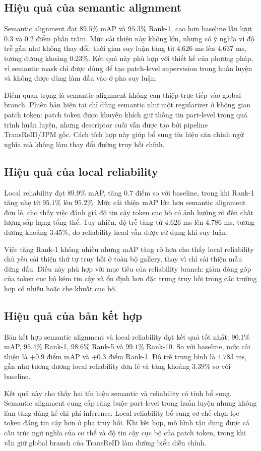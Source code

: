 \subsection{Hiệu quả của semantic alignment}

Semantic alignment đạt $89.5\%$ mAP và $95.3\%$ Rank-1, cao hơn baseline lần
lượt $0.3$ và $0.2$ điểm phần trăm. Mức cải thiện này không lớn, nhưng có ý
nghĩa vì độ trễ gần như không thay đổi: thời gian suy luận tăng từ $4.626$ ms
lên $4.637$ ms, tương đương khoảng $0.23\%$. Kết quả này phù hợp với thiết kế
của phương pháp, vì semantic mask chỉ được dùng để tạo patch-level supervision
trong huấn luyện và không được dùng làm đầu vào ở pha suy luận.

Điểm quan trọng là semantic alignment không can thiệp trực tiếp vào global
branch. Phiên bản hiện tại chỉ dùng semantic như một regularizer ở không gian
patch token: patch token được khuyến khích giữ thông tin part-level trong quá
trình huấn luyện, nhưng descriptor cuối vẫn được tạo bởi pipeline TransReID/JPM
gốc. Cách tích hợp này giúp bổ sung tín hiệu căn chỉnh ngữ nghĩa mà không làm
thay đổi đường truy hồi chính.

\subsection{Hiệu quả của local reliability}

Local reliability đạt $89.9\%$ mAP, tăng $0.7$ điểm so với baseline, trong khi
Rank-1 tăng nhẹ từ $95.1\%$ lên $95.2\%$. Mức cải thiện mAP lớn hơn semantic
alignment đơn lẻ, cho thấy việc đánh giá độ tin cậy token cục bộ có ảnh hưởng
rõ đến chất lượng sắp hạng tổng thể. Tuy nhiên, độ trễ tăng từ $4.626$ ms lên
$4.786$ ms, tương đương khoảng $3.45\%$, do reliability head vẫn được sử dụng
khi suy luận.

Việc tăng Rank-1 không nhiều nhưng mAP tăng rõ hơn cho thấy local reliability
chủ yếu cải thiện thứ tự truy hồi ở toàn bộ gallery, thay vì chỉ cải thiện mẫu
đứng đầu. Điều này phù hợp với mục tiêu của reliability branch: giảm đóng góp
của token cục bộ kém tin cậy và ổn định hơn đặc trưng truy hồi trong các trường
hợp có nhiễu hoặc che khuất cục bộ.

\subsection{Hiệu quả của bản kết hợp}

Bản kết hợp semantic alignment và local reliability đạt kết quả tốt nhất:
$90.1\%$ mAP, $95.4\%$ Rank-1, $98.6\%$ Rank-5 và $99.1\%$ Rank-10. So với
baseline, mức cải thiện là $+0.9$ điểm mAP và $+0.3$ điểm Rank-1. Độ trễ trung
bình là $4.783$ ms, gần như tương đương local reliability đơn lẻ và tăng khoảng
$3.39\%$ so với baseline.

Kết quả này cho thấy hai tín hiệu semantic và reliability có tính bổ sung.
Semantic alignment cung cấp ràng buộc part-level trong huấn luyện nhưng không
làm tăng đáng kể chi phí inference. Local reliability bổ sung cơ chế chọn lọc
token đáng tin cậy hơn ở pha truy hồi. Khi kết hợp, mô hình tận dụng được cả
cấu trúc ngữ nghĩa của cơ thể và độ tin cậy cục bộ của patch token, trong khi
vẫn giữ global branch của TransReID làm đường biểu diễn chính.

